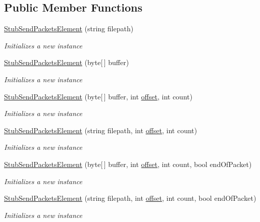 \subsection*{Public Member Functions}
\begin{DoxyCompactItemize}
\item 
\hyperlink{class_system_1_1_net_1_1_sockets_1_1_fakes_1_1_stub_send_packets_element_a5bdd5a50693a2534c67632e6e4d1a18f}{Stub\-Send\-Packets\-Element} (string filepath)
\begin{DoxyCompactList}\small\item\em Initializes a new instance\end{DoxyCompactList}\item 
\hyperlink{class_system_1_1_net_1_1_sockets_1_1_fakes_1_1_stub_send_packets_element_a6b7bc8f960d38fecd2700c54104385c9}{Stub\-Send\-Packets\-Element} (byte\mbox{[}$\,$\mbox{]} buffer)
\begin{DoxyCompactList}\small\item\em Initializes a new instance\end{DoxyCompactList}\item 
\hyperlink{class_system_1_1_net_1_1_sockets_1_1_fakes_1_1_stub_send_packets_element_a4436f851ef471f5d87d580027026b6c6}{Stub\-Send\-Packets\-Element} (byte\mbox{[}$\,$\mbox{]} buffer, int \hyperlink{jquery-1_810_82_8js_a4a9f594d20d927164551fc7fa4751a2f}{offset}, int count)
\begin{DoxyCompactList}\small\item\em Initializes a new instance\end{DoxyCompactList}\item 
\hyperlink{class_system_1_1_net_1_1_sockets_1_1_fakes_1_1_stub_send_packets_element_a70844f304730350abac641412b707800}{Stub\-Send\-Packets\-Element} (string filepath, int \hyperlink{jquery-1_810_82_8js_a4a9f594d20d927164551fc7fa4751a2f}{offset}, int count)
\begin{DoxyCompactList}\small\item\em Initializes a new instance\end{DoxyCompactList}\item 
\hyperlink{class_system_1_1_net_1_1_sockets_1_1_fakes_1_1_stub_send_packets_element_a2289988c7d13b7448eb9432c50a57ec0}{Stub\-Send\-Packets\-Element} (byte\mbox{[}$\,$\mbox{]} buffer, int \hyperlink{jquery-1_810_82_8js_a4a9f594d20d927164551fc7fa4751a2f}{offset}, int count, bool end\-Of\-Packet)
\begin{DoxyCompactList}\small\item\em Initializes a new instance\end{DoxyCompactList}\item 
\hyperlink{class_system_1_1_net_1_1_sockets_1_1_fakes_1_1_stub_send_packets_element_a2552e4a1773a068c053ce4485c2a0812}{Stub\-Send\-Packets\-Element} (string filepath, int \hyperlink{jquery-1_810_82_8js_a4a9f594d20d927164551fc7fa4751a2f}{offset}, int count, bool end\-Of\-Packet)
\begin{DoxyCompactList}\small\item\em Initializes a new instance\end{DoxyCompactList}\end{DoxyCompactItemize}
